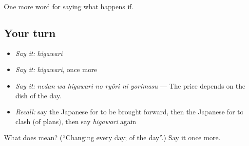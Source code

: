 \begin{grammarlens}[title={What you've built}]
One more word for saying what happens if.
\end{grammarlens}

\subsection*{Your turn}
\begin{itemize}
\raggedright
  \item \emph{Say it:} \emph{higawari}
  \item \emph{Say it:} \emph{higawari}, once more
  \item \emph{Say it:} \emph{nedan wa higawari no ryōri ni yorimasu} — The price depends on the dish of the day.
  \item \emph{Recall:} say the Japanese for to be brought forward, then the Japanese for to clash (of plans), then say \emph{higawari} again
\end{itemize}

\begin{tcolorbox}[breakable,colback=teal!4,colframe=teal!35!black,title={Before you move on}]
What does  mean? (\textquotedblleft{}Changing every day; of the day\textquotedblright{}.) Say it once more.
\end{tcolorbox}
